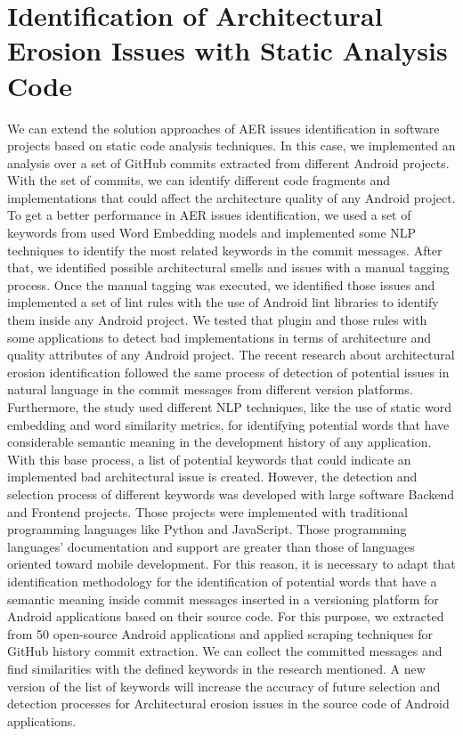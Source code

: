 \chapter{Identification of Architectural Erosion Issues with Static Analysis Code}
\label{cha:identification}

We can extend the solution approaches of AER issues identification in software projects based on static code analysis techniques. In this case, we implemented an analysis over a set of GitHub commits extracted from different Android projects. With the set of commits, we can identify different code fragments and implementations that could affect the architecture quality of any Android project. To get a better performance in AER issues identification, we used a set of keywords from used Word Embedding models and implemented some NLP techniques to identify the most related keywords in the commit messages. After that, we identified possible architectural smells and issues with a manual tagging process. Once the manual tagging was executed, we identified those issues and implemented a set of lint rules with the use of Android lint libraries to identify them inside any Android project. We tested that plugin and those rules with some applications to detect bad implementations in terms of architecture and quality attributes of any Android project.
The recent research about architectural erosion identification followed the same process of detection of potential issues in natural language in the commit messages from different version platforms. Furthermore, the study used different NLP techniques, like the use of static word embedding and word similarity metrics, for identifying potential words that have considerable semantic meaning in the development history of any application. With this base process, a list of potential keywords that could indicate an implemented bad architectural issue is created. However, the detection and selection process of different keywords was developed with large software Backend and Frontend projects. Those projects were implemented with traditional programming languages like Python and JavaScript. Those programming languages' documentation and support are greater than those of languages oriented toward mobile development. For this reason, it is necessary to adapt that identification methodology for the identification of potential words that have a semantic meaning inside commit messages inserted in a versioning platform for Android applications based on their source code. For this purpose, we extracted from 50 open-source Android applications and applied scraping techniques for GitHub history commit extraction. We can collect the committed messages and find similarities with the defined keywords in the research mentioned. A new version of the list of keywords will increase the accuracy of future selection and detection processes for Architectural erosion issues in the source code of Android applications.

